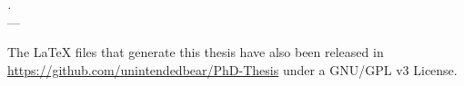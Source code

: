 \label{chap:conclusions} 
\begin{flushright}{\slshape
    .} \\ \medskip
    --- {}
\end{flushright}
\minitoc\mtcskip
\vfill



The LaTeX files that generate this thesis have also been released in \url{https://github.com/unintendedbear/PhD-Thesis} under a GNU/GPL v3 License.
